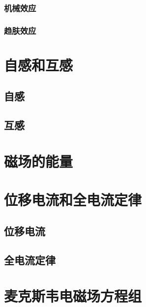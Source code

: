        \subsubsection{机械效应}
        \subsubsection{趋肤效应}

\section{自感和互感}
    \subsection{自感}
    \subsection{互感}

\section{磁场的能量}

\section{位移电流和全电流定律}
    \subsection{位移电流}
    \subsection{全电流定律}

\section{麦克斯韦电磁场方程组}

\endinput